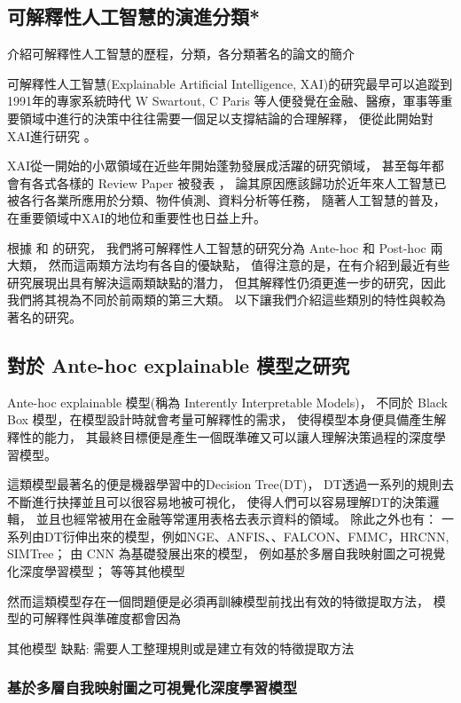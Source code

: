 \documentclass[class=NCU_thesis, crop=false]{standalone}
\begin{document}
\subsection{可解釋性人工智慧的演進分類*}


介紹可解釋性人工智慧的歷程，分類，各分類著名的論文的簡介

可解釋性人工智慧(Explainable Artificial Intelligence, XAI)的研究最早可以追蹤到1991年的專家系統時代 W Swartout, C Paris 等人便發覺在金融、醫療，軍事等重要領域中進行的決策中往往需要一個足以支撐結論的合理解釋，
便從此開始對XAI進行研究 \cite{87686}。

XAI從一開始的小眾領域在近些年開始蓬勃發展成活躍的研究領域，
甚至每年都會有各式各樣的 Review Paper 被發表\cite{A2023100230} \cite{10188681}，
論其原因應該歸功於近年來人工智慧已被各行各業所應用於分類、物件偵測、資料分析等任務，
隨著人工智慧的普及，在重要領域中XAI的地位和重要性也日益上升。

根據 \cite{Nielsen_2022} 和 \cite{LONGO2024102301} 的研究，
我們將可解釋性人工智慧的研究分為 Ante-hoc 和 Post-hoc 兩大類，
然而這兩類方法均有各自的優缺點，
值得注意的是，在\cite{LONGO2024102301}有介紹到最近有些研究展現出具有解決這兩類缺點的潛力，
但其解釋性仍須更進一步的研究，因此我們將其視為不同於前兩類的第三大類。
以下讓我們介紹這些類別的特性與較為著名的研究。

\subsection{對於 Ante-hoc explainable 模型之研究}
Ante-hoc explainable 模型(\cite{Nielsen_2022}稱為 Interently Interpretable Models)，
不同於 Black Box 模型，在模型設計時就會考量可解釋性的需求，
使得模型本身便具備產生解釋性的能力，
其最終目標便是產生一個既準確又可以讓人理解決策過程的深度學習模型。

這類模型最著名的便是機器學習中的Decision Tree(DT)\cite{rokach2016decision}，
DT透過一系列的規則去不斷進行抉擇並且可以很容易地被可視化，
使得人們可以容易理解DT的決策邏輯，
並且也經常被用在金融等常運用表格去表示資料的領域\cite{grinsztajn2022tree}。
除此之外也有：
一系列由DT衍伸出來的模型，例如NGE、ANFIS、、FALCON、FMMC，HRCNN, SIMTree；
由 CNN 為基礎發展出來的模型， 例如基於多層自我映射圖之可視覺化深度學習模型；
等等其他模型

然而這類模型存在一個問題便是必須再訓練模型前找出有效的特徵提取方法，
模型的可解釋性與準確度都會因為


其他模型
缺點: 需要人工整理規則或是建立有效的特徵提取方法


\subsubsection{基於多層自我映射圖之可視覺化深度學習模型}
\end{document}
